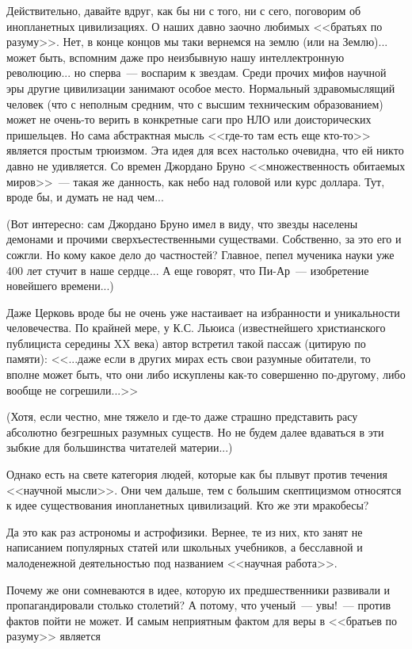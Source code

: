 \documentclass{scrbook}
\newcommand{\flqq}{<<}
\newcommand{\frqq}{>>}
\newcommand{\mdash}{~--- }
\begin{document}
Действительно, давайте вдруг, как бы ни с того, ни с сего, поговорим об инопланетных цивилизациях. О наших давно заочно любимых {\flqq}братьях по разуму{\frqq}. Нет, в конце концов мы таки вернемся на землю (или на Землю)... может быть, вспомним даже про неизбывную нашу интеллектронную революцию... но сперва{\mdash}воспарим к звездам.
Среди прочих мифов научной эры другие цивилизации занимают особое место. Нормальный здравомыслящий человек (что с неполным средним, что с высшим техническим образованием) может не очень-то верить в конкретные саги про НЛО или доисторических пришельцев. Но сама абстрактная мысль {\flqq}где-то там есть еще кто-то{\frqq} является простым трюизмом. Эта идея для всех настолько очевидна, что ей никто давно не удивляется. Со времен Джордано Бруно {\flqq}множественность обитаемых миров{\frqq}{\mdash}такая же данность, как небо над головой или курс доллара. Тут, вроде бы, и думать не над чем...

(Вот интересно: сам Джордано Бруно имел в виду, что звезды населены демонами и прочими сверхъестественными существами. Собственно, за это его и сожгли. Но кому какое дело до частностей? Главное, пепел мученика науки уже 400 лет стучит в наше сердце... А еще говорят, что Пи-Ар{\mdash}изобретение новейшего времени...)

Даже Церковь вроде бы не очень уже настаивает на избранности и уникальности человечества. По крайней мере, у К.С. Льюиса (известнейшего христианского публициста середины XX века) автор встретил такой пассаж (цитирую по памяти): {\flqq}...даже если в других мирах есть свои разумные обитатели, то вполне может быть, что они либо искуплены как-то совершенно по-другому, либо вообще не согрешили...{\frqq}

(Хотя, если честно, мне тяжело и где-то даже страшно представить расу абсолютно безгрешных разумных существ. Но не будем далее вдаваться в эти зыбкие для большинства читателей материи...)

Однако есть на свете категория людей, которые как бы плывут против течения {\flqq}научной мысли{\frqq}. Они чем дальше, тем с большим скептицизмом относятся к идее существования инопланетных цивилизаций. Кто же эти мракобесы?

Да это как раз астрономы и астрофизики. Вернее, те из них, кто занят не написанием популярных статей или школьных учебников, а бесславной и малоденежной деятельностью под названием {\flqq}научная работа{\frqq}.

Почему же они сомневаются в идее, которую их предшественники развивали и пропагандировали столько столетий? А потому, что ученый{\mdash}увы!{\mdash}против фактов пойти не может. И самым неприятным фактом для веры в {\flqq}братьев по разуму{\frqq} является
\end{document}
